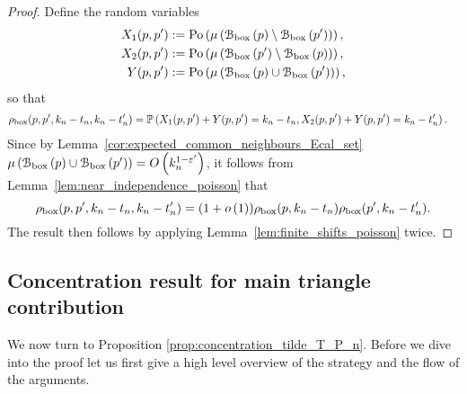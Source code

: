 \begin{proof}
Define the random variables
\begin{align*}
	X_1(p,p^\prime) &:= {\mathrm{Po}}\left(\mu\left({\mathcal B}_{\text{box}}\left(p\right)\setminus {\mathcal B}_{\text{box}}\left(p^\prime\right)\right)\right),\\
	X_2(p,p^\prime) &:= {\mathrm{Po}}\left(\mu\left({\mathcal B}_{\text{box}}\left(p^\prime\right)\setminus {\mathcal B}_{\text{box}}\left(p\right)\right)\right),\\
	Y(p,p^\prime) &:= {\mathrm{Po}}\left(\mu\left({\mathcal B}_{\text{box}}\left(p\right) \cup {\mathcal B}_{\text{box}}\left(p^\prime\right)\right)\right),
\end{align*}
so that
\begin{align*}
	\rho_{\text{box}}(p,p^\prime,k_n-t_n,k_n-t_n^\prime) &= \mathbb{P}\left(X_1(p,p^\prime) + Y(p,p^\prime) = k_n-t_n, X_2(p,p^\prime) + Y(p,p^\prime) = k_n - t_n^\prime\right).
\end{align*}
Since by Lemma~\ref{cor:expected_common_neighbours_Ecal_set} $\mu\left({\mathcal B}_{\text{box}}\left(p\right) \cup {\mathcal B}_{\text{box}}\left(p^\prime\right)\right) = O\left(k_n^{1-\varepsilon^\prime}\right)$, it follows from Lemma~\ref{lem:near_independence_poisson} that
\[
	\rho_{\text{box}}(p,p^\prime,k_n-t_n,k_n-t_n^\prime) = (1+o\left(1\right))\rho_{\text{box}}(p,k_n-t_n)\rho_{\text{box}}(p^\prime,k_n-t_n^\prime).
\]
The result then follows by applying Lemma~\ref{lem:finite_shifts_poisson} twice.
\end{proof}

\subsection{Concentration result for main triangle contribution}\label{ssec:concentration_tilde_T}

We now turn to Proposition \ref{prop:concentration_tilde_T_P_n}. Before we dive into the proof let us first give a high level overview of the strategy and the flow of the arguments. 

